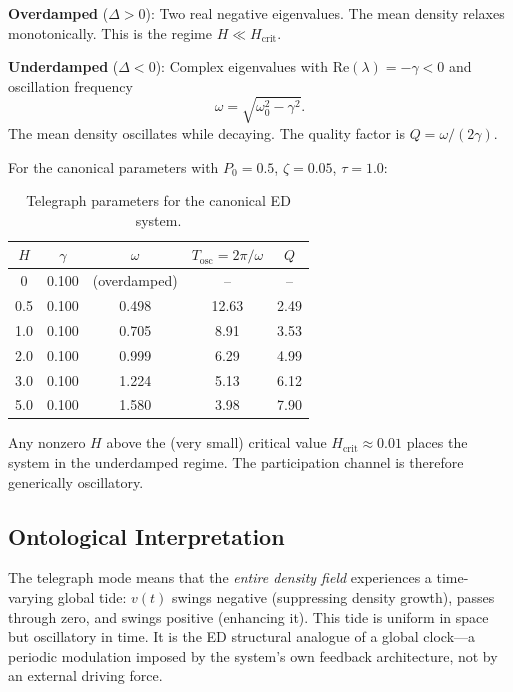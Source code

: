 \documentclass[11pt]{article}
\begin{document}
\textbf{Overdamped} (\(\Delta > 0\)): Two real negative eigenvalues. The mean density relaxes monotonically. This is the regime \(H \ll H_{\mathrm{crit}}\).

\textbf{Underdamped} (\(\Delta < 0\)): Complex eigenvalues with \(\mathrm{Re}(\lambda) = -\gamma < 0\) and oscillation frequency
\begin{equation}\label{eq:omega}
  \omega = \sqrt{\omega_0^2 - \gamma^2}.
\end{equation}
The mean density oscillates while decaying. The quality factor is \(Q = \omega / (2\gamma)\).

For the canonical parameters with \(P_0 = 0.5\), \(\zeta = 0.05\), \(\tau = 1.0\):

\begin{table}[h]
\centering
\begin{tabular}{@{}ccccc@{}}
\toprule
\(H\) & \(\gamma\) & \(\omega\) & \(T_{\mathrm{osc}} = 2\pi/\omega\) & \(Q\) \\
\midrule
0   & 0.100 & (overdamped) & -- & -- \\
0.5 & 0.100 & 0.498 & 12.63 & 2.49 \\
1.0 & 0.100 & 0.705 & 8.91  & 3.53 \\
2.0 & 0.100 & 0.999 & 6.29  & 4.99 \\
3.0 & 0.100 & 1.224 & 5.13  & 6.12 \\
5.0 & 0.100 & 1.580 & 3.98  & 7.90 \\
\bottomrule
\end{tabular}
\caption{Telegraph parameters for the canonical ED system.}
\label{tab:telegraph}
\end{table}

Any nonzero \(H\) above the (very small) critical value \(H_{\mathrm{crit}} \approx 0.01\) places the system in the underdamped regime. The participation channel is therefore generically oscillatory.

\subsection{Ontological Interpretation}

The telegraph mode means that the \emph{entire density field} experiences a time-varying global tide: \(v(t)\) swings negative (suppressing density growth), passes through zero, and swings positive (enhancing it). This tide is uniform in space but oscillatory in time. It is the ED structural analogue of a global clock---a periodic modulation imposed by the system's own feedback architecture, not by an external driving force.
\end{document}
